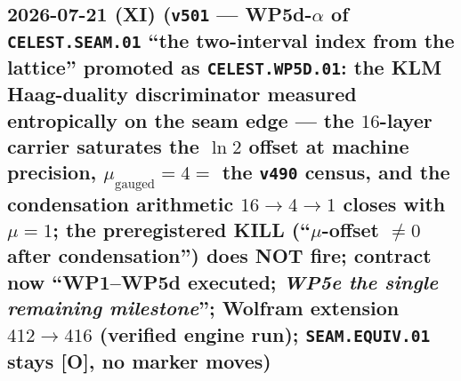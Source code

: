 \documentclass[11pt]{article}
\providecommand{\mO}{\textbf{[O]}}\providecommand{\mX}{\textbf{[X]}}
\begin{document}
\subsection*{2026-07-21 (XI) (\texttt{v501} --- WP5d-$\alpha$ of \texttt{CELEST.SEAM.01} ``the two-interval index from the lattice'' promoted as \texttt{CELEST.WP5D.01}: the KLM Haag-duality discriminator measured entropically on the seam edge --- the $16$-layer carrier saturates the $\ln2$ offset at machine precision, $\mu_{\mathrm{gauged}}=4=$ the \texttt{v490} census, and the condensation arithmetic $16\to4\to1$ closes with $\mu=1$; the preregistered KILL (``$\mu$-offset $\neq0$ after condensation'') does NOT fire; contract now ``WP1--WP5d executed; \emph{WP5e the single remaining milestone}''; Wolfram extension $412\to416$ (verified engine run); \texttt{SEAM.EQUIV.01} stays \mO, no marker moves)}
\end{document}
